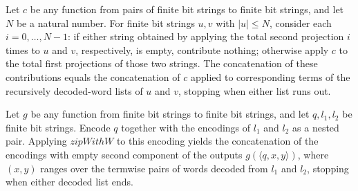 \begin{theorem}
\label{Complexity.BinArith.flatMap_zipLoop}
\leanok
{}
Let $c$ be any function from pairs of finite bit strings to finite bit strings, and let
$N$ be a natural number. For finite bit strings $u,v$ with $|u|\le N$, consider each
$i=0,\ldots,N-1$: if either string obtained by applying the total second projection $i$
times to $u$ and $v$, respectively, is empty, contribute nothing; otherwise apply $c$ to
the total first projections of those two strings. The concatenation of these
contributions equals the concatenation of $c$ applied to corresponding terms of the
recursively decoded-word lists of $u$ and $v$, stopping when either list runs out.
\end{theorem}

\begin{theorem}
\label{Complexity.BinArith.zipWithW_pairEncode}
\leanok
{}
Let $g$ be any function from finite bit strings to finite bit strings, and let
$q,l_1,l_2$ be finite bit strings. Encode $q$ together with the encodings of $l_1$ and
$l_2$ as a nested pair. Applying $zipWithW$ to this encoding yields the concatenation of
the encodings with empty second component of the outputs $g(\langle q,x,y\rangle)$,
where $(x,y)$ ranges over the termwise pairs of words decoded from $l_1$ and $l_2$,
stopping when either decoded list ends.
\end{theorem}

